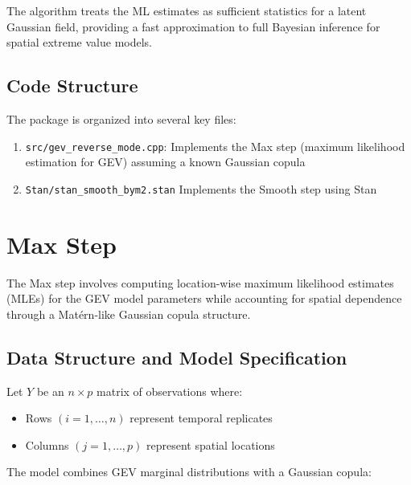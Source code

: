 \documentclass[
  letterpaper,
  DIV=11,
  numbers=noendperiod]{scrartcl}
\providecommand{\tightlist}{%
  \setlength{\itemsep}{0pt}\setlength{\parskip}{0pt}}\usepackage{longtable,booktabs,array}
\begin{document}
The algorithm treats the ML estimates as sufficient statistics for a
latent Gaussian field, providing a fast approximation to full Bayesian
inference for spatial extreme value models.

\subsection{Code Structure}\label{code-structure}

The package is organized into several key files:

\begin{enumerate}
\def\labelenumi{\arabic{enumi}.}
\tightlist
\item
  \texttt{src/gev\_reverse\_mode.cpp}: Implements the Max step (maximum
  likelihood estimation for GEV) assuming a known Gaussian copula
\item
  \texttt{Stan/stan\_smooth\_bym2.stan} Implements the Smooth step using
  Stan
\end{enumerate}

\section{Max Step}\label{max-step}

The Max step involves computing location-wise maximum likelihood
estimates (MLEs) for the GEV model parameters while accounting for
spatial dependence through a Matérn-like Gaussian copula structure.

\subsection{Data Structure and Model
Specification}\label{data-structure-and-model-specification}

Let \(Y\) be an \(n \times p\) matrix of observations where:

\begin{itemize}
\tightlist
\item
  Rows \((i=1,\ldots,n)\) represent temporal replicates
\item
  Columns \((j=1,\ldots,p)\) represent spatial locations
\end{itemize}

The model combines GEV marginal distributions with a Gaussian copula:
\end{document}
